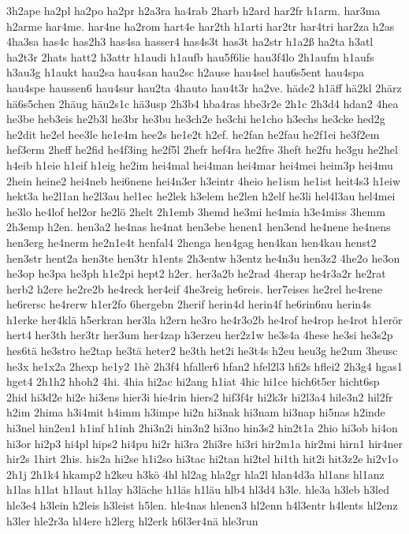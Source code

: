 {3h2ape
ha2pl
ha2po
ha2pr
h2a3ra
ha4rab
2harb
h2ard
har2fr
h1arm.
har3ma
h2arme
har4me.
har4ne
ha2rom
hart4e
har2th
h1arti
har2tr
har4tri
har2za
h2as
4ha3sa
has4c
has2h3
has4sa
hasser4
has4s3t
has3t
ha2str
h1a2ß
ha2ta
h3atl
ha2t3r
2hats
hatt2
h3attr
h1audi
h1aufb
hau5f6lie
hau3f4lo
2h1aufm
h1aufs
h3au3g
h1aukt
hau2sa
hau4san
hau2sc
h2ause
hau4sel
hau6s5ent
hau4spa
hau4spe
haussen6
hau4sur
hau2ta
4hauto
hau4t3r
ha2ve.
häde2
h1äff
hä2kl
2härz
hä6s5chen
2häug
häu2s1c
hä3usp
2h3b4
hba4ras
hbe3r2e
2h1c
2h3d4
hdan2
4hea
he3be
heb3eis
he2b3l
he3br
he3bu
he3ch2e
he3chi
he1cho
h3echs
he3cke
hed2g
he2dit
he2el
hee3le
he1e4m
hee2s
he1e2t
h2ef.
he2fan
he2fau
he2f1ei
he3f2em
hef3erm
2heff
he2fid
he4f3ing
he2f5l
2hefr
hef4ra
he2fre
3heft
he2fu
he3gu
he2hel
h4eib
h1eie
h1eif
h1eig
he2im
hei4mal
hei4man
hei4mar
hei4mei
heim3p
hei4mu
2hein
heine2
hei4neb
hei6nene
hei4n3er
h3eintr
4heio
he1ism
he1ist
heit4s3
h1eiw
hekt3a
he2l1an
he2l3au
hel1ec
he2lek
h3elem
he2len
h2elf
he3li
hel4l3au
hel4mei
he3lo
he4lof
hel2or
he2lö
2helt
2h1emb
3hemd
he3mi
he4mia
h3e4miss
3hemm
2h3emp
h2en.
hen3a2
he4nas
he4nat
hen3ebe
henen1
hen3end
he4nene
he4nens
hen3erg
he4nerm
he2n1e4t
henfal4
2henga
hen4gag
hen4kan
hen4kau
henst2
hen3str
hent2a
hen3te
hen3tr
h1ents
2h3entw
h3entz
he4n3u
hen3z2
4he2o
he3on
he3op
he3pa
he3ph
h1e2pi
hept2
h2er.
her3a2b
he2rad
4herap
he4r3a2r
he2rat
herb2
h2ere
he2re2b
he4reck
her4eif
4he3reig
he6reis.
her7eises
he2rel
he4rene
he6rersc
he4rerw
h1er2fo
6hergebn
2herif
herin4d
herin4f
he6rin6nu
herin4s
h1erke
her4klä
h5erkran
her3la
h2ern
he3ro
he4r3o2b
he4rof
he4rop
he4rot
h1erör
hert4
her3th
her3tr
her3um
her4zap
h3erzeu
her2z1w
he3s4a
4hese
he3si
he3s2p
hes6tä
he3stro
he2tap
he3tä
heter2
he3th
het2i
he3t4s
h2eu
heu3g
he2um
3heusc
he3x
he1x2a
2hexp
he1y2
1hè
2h3f4
hfaller6
hfan2
hfel2l3
hfi2s
hflei2
2h3g4
hgas1
hget4
2h1h2
hhoh2
4hi.
4hia
hi2ac
hi2ang
h1iat
4hic
hi1ce
hich6t5er
hicht6sp
2hid
hi3d2e
hi2e
hi3ens
hier3i
hie4rin
hiers2
hif3f4r
hi2k3r
hi2l3a4
hile3n2
hil2fr
h2im
2hima
h3i4mit
h4imm
h3impe
hi2n
hi3nak
hi3nam
hi3nap
hi5nas
h2inde
hi3nel
hin2en1
h1inf
h1inh
2hi3n2i
hin3n2
hi3no
hin3s2
hin2t1a
2hio
hi3ob
hi4on
hi3or
hi2p3
hi4pl
hips2
hi4pu
hi2r
hi3ra
2hi3re
hi3ri
hir2m1a
hir2mi
hirn1
hir4ner
hir2s
1hirt
2his.
his2a
hi2se
h1i2so
hi3tac
hi2tan
hi2tel
hi1th
hit2i
hit3z2e
hi2v1o
2h1j
2h1k4
hkamp2
h2keu
h3kö
4hl
hl2ag
hla2gr
hla2l
hlan4d3a
hl1ans
hl1anz
h1las
h1lat
h1laut
h1lay
h3läche
h1läs
h1läu
hlb4
hl3d4
h3le.
hle3a
h3leb
h3led
hle3e4
h3lein
h2leis
h3leist
h5len.
hle4nas
hlenen3
hl2enn
h4l3entr
h4lents
hl2enz
h3ler
hle2r3a
hl4ere
h2lerg
hl2erk
h6l3er4nä
hle3run
}

